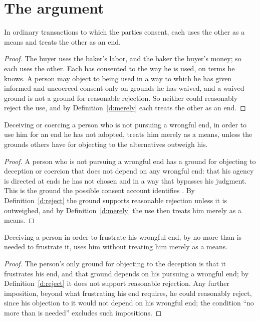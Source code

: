 \documentclass{situationist-preprint}
\begin{document}
\section{The argument}

\begin{proposition}\label{p:ordinary}
In ordinary transactions to which the parties consent, each uses the other as a means and treats the other as an end.
\end{proposition}

\begin{proof}
The buyer uses the baker's labor, and the baker the buyer's money; so each uses the other. Each has consented to the way he is used, on terms he knows. A person may object to being used in a way to which he has given informed and uncoerced consent only on grounds he has waived, and a waived ground is not a ground for reasonable rejection. So neither could reasonably reject the use, and by Definition~\ref{d:merely} each treats the other as an end.
\end{proof}

\begin{proposition}\label{p:innocent}
Deceiving or coercing a person who is not pursuing a wrongful end, in order to use him for an end he has not adopted, treats him merely as a means, unless the grounds others have for objecting to the alternatives outweigh his.
\end{proposition}

\begin{proof}
A person who is not pursuing a wrongful end has a ground for objecting to deception or coercion that does not depend on any wrongful end: that his agency is directed at ends he has not chosen and in a way that bypasses his judgment. This is the ground the possible consent account identifies \citep{ONeill1985}. By Definition~\ref{d:reject} the ground supports reasonable rejection unless it is outweighed, and by Definition~\ref{d:merely} the use then treats him merely as a means.
\end{proof}

\begin{proposition}\label{p:wrongdoer}
Deceiving a person in order to frustrate his wrongful end, by no more than is needed to frustrate it, uses him without treating him merely as a means.
\end{proposition}

\begin{proof}
The person's only ground for objecting to the deception is that it frustrates his end, and that ground depends on his pursuing a wrongful end; by Definition~\ref{d:reject} it does not support reasonable rejection. Any further imposition, beyond what frustrating his end requires, he could reasonably reject, since his objection to it would not depend on his wrongful end; the condition \enquote{no more than is needed} excludes such impositions.
\end{proof}
\end{document}
